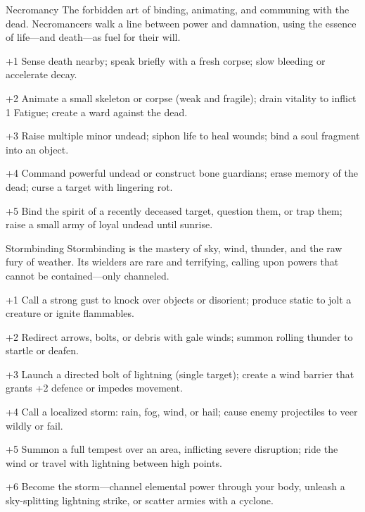 \begin{WyrdSpell}[Necromancy]{Necromancy}
    The forbidden art of binding, animating, and communing with the dead. Necromancers walk a line between power and damnation, using the essence of life—and death—as fuel for their will.

    \begin{WyrdSpellBlock}
        \item[+1] Sense death nearby; speak briefly with a fresh corpse; slow bleeding or accelerate decay.
        \item[+2] Animate a small skeleton or corpse (weak and fragile); drain vitality to inflict 1 Fatigue; create a ward against the dead.
        \item[+3] Raise multiple minor undead; siphon life to heal wounds; bind a soul fragment into an object.
        \item[+4] Command powerful undead or construct bone guardians; erase memory of the dead; curse a target with lingering rot.
        \item[+5] Bind the spirit of a recently deceased target, question them, or trap them; raise a small army of loyal undead until sunrise.
    \end{WyrdSpellBlock}
\end{WyrdSpell}

\begin{WyrdSpell}[Elemental]{Stormbinding}
    Stormbinding is the mastery of sky, wind, thunder, and the raw fury of weather. Its wielders are rare and terrifying, calling upon powers that cannot be contained—only channeled.

    \begin{WyrdSpellBlock}
        \item[+1] Call a strong gust to knock over objects or disorient; produce static to jolt a creature or ignite flammables.
        \item[+2] Redirect arrows, bolts, or debris with gale winds; summon rolling thunder to startle or deafen.
        \item[+3] Launch a directed bolt of lightning (single target); create a wind barrier that grants +2 defence or impedes movement.
        \item[+4] Call a localized storm: rain, fog, wind, or hail; cause enemy projectiles to veer wildly or fail.
        \item[+5] Summon a full tempest over an area, inflicting severe disruption; ride the wind or travel with lightning between high points.
        \item[+6] Become the storm—channel elemental power through your body, unleash a sky-splitting lightning strike, or scatter armies with a cyclone.
    \end{WyrdSpellBlock}
\end{WyrdSpell}

